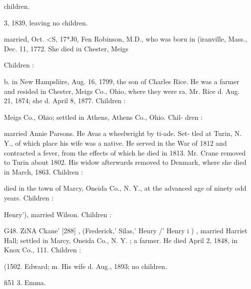\documentclass[oneside]{book}
\begin{document}
children. 



3, 1839, leaving no children. 

married, Oct. <S, 17*J0, Fen Robinson, M.D., who was boru in 
(iranville, Mass., Dec. 11, 1772. She died iu Chester, Meigs 

Children : 












b. in New Hampsliire, Aug. 16, 1799, the son of Charles Rice. 
He was a farmer and resided in Chester, Meigs Co., Ohio, 
where they were ra. Mr. Rice d. Aug. 21, 1874; she d. April 
8, 1877. Children : 










Meigs Co., Ohio; settled in Athens, Athens Co., Ohio. Chil- 
dren : 









married Annie Parsons. He Avas a wheelwright by ti-ade. Set- 
tled at Turin, N. Y., of which place his wife was a native. He 
served in the War of 1812 and contracted a fever, from the 
effects of which he died in 1813. Mr. Crane removed to Turin 
about 1802. His widow afterwards removed to Denmark, where 
she died in March, 1863. Children : 


died in the town of Marcy, Oneida Co., N. Y., at the advanced 
age of ninety odd years. Children : 











Henry'), married Wilson. Children : 






G48. ZiNA Ckane' [288] , (Frederick,' Silas,' Heury /' Henry i ) , 
married Harriet Hall; settled in Marcy, Oneida Co., N. Y. ; a 
farmer. He died April 2, 1848, in Knox Co., 111. Children : 


(1502. Edward; m. His wife d. Aug., 1893; no children. 

fi51  3. Emma. 
\end{document}
